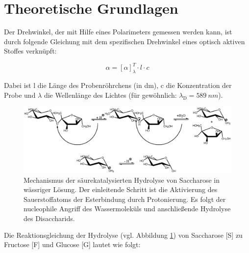 \setlength\abovedisplayshortskip{20pt}
\setlength\belowdisplayshortskip{20pt}
\setlength\abovedisplayskip{20pt}
\setlength\belowdisplayskip{20pt}

\section{Theoretische Grundlagen \cite{wedler}}


Der Drehwinkel, der mit Hilfe eines Polarimeters gemessen werden kann, ist durch folgende Gleichung mit dem spezifischen Drehwinkel eines optisch aktiven Stoffes verknüpft:

\begin{equation}
\alpha=\left[\alpha\right]_\lambda^T \cdot l \cdot c
\label{eq:Drehwinkelallgemein}
\end{equation}

Dabei ist l die Länge des Probenröhrchens (in dm), c die Konzentration der Probe und $\lambda$ die Wellenlänge des Lichtes (für gewöhnlich: $\lambda_\text{D}=589~\si{nm}$).


\begin{figure}[H]


     \includegraphics[width=1\linewidth]{Bilder/hydrolyse.eps}
\caption{Mechanismus der säurekatalysierten Hydrolyse
von Saccharose in wässriger Lösung. Der einleitende Schritt ist
die Aktivierung des Sauerstoffatoms der Esterbindung durch Protonierung. Es folgt der nucleophile Angriff des Wassermoleküls und anschließende Hydrolyse des 
Disaccharids.}
\label{fig:hydrolyse}
\end{figure}

Die Reaktionsgleichung der Hydrolyse (vgl. Abbildung \ref{fig:hydrolyse}) von Saccharose [S] zu Fructose [F] und Glucose [G] lautet wie folgt: 

